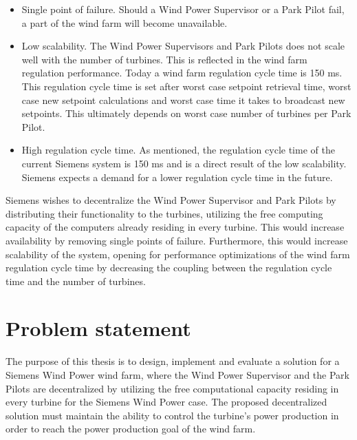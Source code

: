 \begin{itemize} 
	\item Single point of failure. Should a Wind Power Supervisor or a Park Pilot fail, a part of the wind farm will become unavailable.
	\item Low scalability. The Wind Power Supervisors and Park Pilots does not scale well with the number of turbines. This is reflected in the wind farm regulation performance. Today a wind farm regulation cycle time is 150 ms. This regulation cycle time is set after worst case setpoint retrieval time, worst case new setpoint calculations and worst case time it takes to broadcast new setpoints. This ultimately depends on worst case number of turbines per Park Pilot.
	\item High regulation cycle time. As mentioned, the regulation cycle time of the current Siemens system is 150 ms and is a direct result of the low scalability. Siemens expects a demand for a lower regulation cycle time in the future.
\end{itemize}

Siemens wishes to decentralize the Wind Power Supervisor and Park Pilots by distributing their functionality to the turbines, utilizing the free computing capacity of the computers already residing in every turbine. This would increase availability by removing single points of failure. Furthermore, this would increase scalability of the system, opening for performance optimizations of the wind farm regulation cycle time by decreasing the coupling between the regulation cycle time and the number of turbines. 

\section{Problem statement}
\label{sec:problemStatement}

The purpose of this thesis is to design, implement and evaluate a solution for a Siemens Wind Power wind farm, where the Wind Power Supervisor and the Park Pilots are decentralized by utilizing the free computational capacity residing in every turbine for the Siemens Wind Power case. The proposed decentralized solution must maintain the ability to control the turbine's power production in order to reach the power production goal of the wind farm. 

